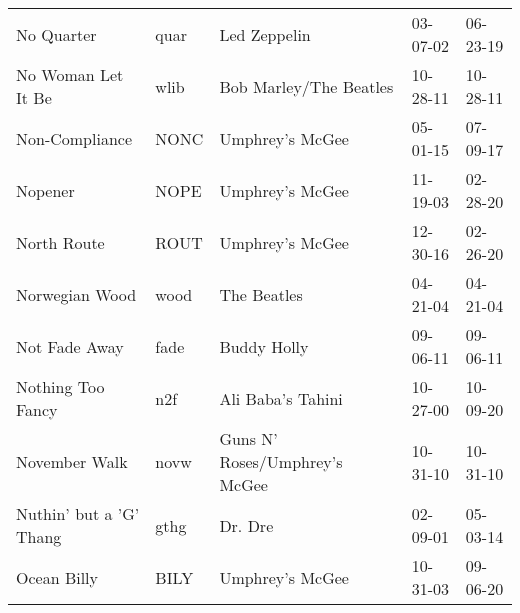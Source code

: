 \begin{longtable}{p{}p{}p{}p{}p{}}
                                                              No Quarter &          quar &                                             Led Zeppelin &              03-07-02 &             06-23-19 \\
                                                      No Woman Let It Be &          wlib &                                   Bob Marley/The Beatles &              10-28-11 &             10-28-11 \\
                                                          Non-Compliance &          NONC &                                          Umphrey's McGee &              05-01-15 &             07-09-17 \\
                                                                 Nopener &          NOPE &                                          Umphrey's McGee &              11-19-03 &             02-28-20 \\
                                                             North Route &          ROUT &                                          Umphrey's McGee &              12-30-16 &             02-26-20 \\
                                                          Norwegian Wood &          wood &                                              The Beatles &              04-21-04 &             04-21-04 \\
                                                           Not Fade Away &          fade &                                              Buddy Holly &              09-06-11 &             09-06-11 \\
                                                       Nothing Too Fancy &           n2f &                                        Ali Baba's Tahini &              10-27-00 &             10-09-20 \\
                                                           November Walk &          novw &                            Guns N' Roses/Umphrey's McGee &              10-31-10 &             10-31-10 \\
                                                 Nuthin' but a 'G' Thang &          gthg &                                                  Dr. Dre &              02-09-01 &             05-03-14 \\
                                                             Ocean Billy &          BILY &                                          Umphrey's McGee &              10-31-03 &             09-06-20 \\

\end{longtable}

